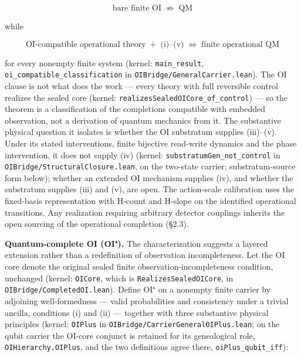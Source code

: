 \documentclass[
]{article}
\begin{document}
\[\boxed{\;\text{bare finite OI} \;\not\Rightarrow\; \mathrm{QM}\;}\]

while

\[\boxed{\;\text{OI-compatible operational theory} \;+\; \text{(i)–(v)} \;\iff\; \text{finite operational QM}\;}\]

for every nonempty finite system (kernel: \texttt{main\_result},
\texttt{oi\_compatible\_classification} in
\texttt{OIBridge/GeneralCarrier.lean}). The OI clause is not what does
the work --- every theory with full reversible control realizes the
sealed core (kernel: \texttt{realizesSealedOICore\_of\_control}) --- so
the theorem is a classification of the completions compatible with
embedded observation, not a derivation of quantum mechanics from it. The
substantive physical question it isolates is whether the OI substratum
supplies (iii)--(v). Under its stated interventions, finite bijective
read-write dynamics and the phase intervention, it does not supply (iv)
(kernel: \texttt{substratumGen\_not\_control} in
\texttt{OIBridge/StructuralClosure.lean}, on the two-state carrier;
substratum-source form below); whether an extended OI mechanism supplies
(iv), and whether the substratum supplies (iii) and (v), are open. The
action-scale calibration uses the fixed-basis representation with
H-count and H-slope on the identified operational transitions. Any
realization requiring arbitrary detector couplings inherits the open
sourcing of the operational completion (§2.3).

\textbf{Quantum-complete OI (OI⁺).} The characterization suggests a
layered extension rather than a redefinition of observation
incompleteness. Let the OI core denote the original sealed finite
observation-incompleteness condition, unchanged (kernel:
\texttt{OICore}, which is \texttt{RealizesSealedOICore}, in
\texttt{OIBridge/CompletedOI.lean}). Define OI⁺ on a nonempty finite
carrier by adjoining well-formedness --- valid probabilities and
consistency under a trivial ancilla, conditions (i) and (ii) ---
together with three substantive physical principles (kernel:
\texttt{OIPlus} in \texttt{OIBridge/CarrierGeneralOIPlus.lean}; on the
qubit carrier the OI-core conjunct is retained for its genealogical
role, \texttt{OIHierarchy.OIPlus}, and the two definitions agree there,
\texttt{oiPlus\_qubit\_iff}):
\end{document}
